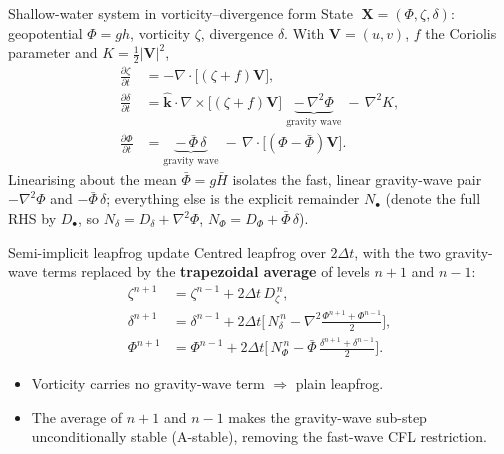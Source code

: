\documentclass{beamer}
\begin{document}
\begin{frame}{Shallow-water system in vorticity--divergence form}
    State $\;\mathbf{X}=(\Phi,\zeta,\delta)$: geopotential $\Phi=gh$, vorticity $\zeta$, divergence $\delta$.
    With $\mathbf{V}=(u,v)$, $f$ the Coriolis parameter and $K=\tfrac12|\mathbf V|^2$,
    \begin{align}
        \frac{\partial \zeta}{\partial t} &= -\nabla\!\cdot\!\big[(\zeta+f)\mathbf V\big], \\[2pt]
        \frac{\partial \delta}{\partial t} &= \hat{\mathbf k}\cdot\nabla\!\times\!\big[(\zeta+f)\mathbf V\big]
              \;\underbrace{-\,\nabla^2\Phi}_{\text{gravity wave}}\; -\,\nabla^2 K, \\[2pt]
        \frac{\partial \Phi}{\partial t} &= \underbrace{-\,\bar\Phi\,\delta}_{\text{gravity wave}}
              \;-\,\nabla\!\cdot\!\big[(\Phi-\bar\Phi)\mathbf V\big].
    \end{align}
    Linearising about the mean $\bar\Phi=g\bar H$ isolates the fast, linear gravity-wave pair
    $-\nabla^2\Phi$ and $-\bar\Phi\,\delta$; everything else is the explicit remainder
    $N_\bullet$ (denote the full RHS by $D_\bullet$, so $N_\delta=D_\delta+\nabla^2\Phi$, $N_\Phi=D_\Phi+\bar\Phi\,\delta$).
\end{frame}

\begin{frame}{Semi-implicit leapfrog update}
    Centred leapfrog over $2\Delta t$, with the two gravity-wave terms replaced by the
    \textbf{trapezoidal average} of levels $n{+}1$ and $n{-}1$:
    \begin{align}
        \zeta^{n+1} &= \zeta^{n-1} + 2\Delta t\, D_\zeta^{\,n}, \\
        \delta^{n+1} &= \delta^{n-1} + 2\Delta t\Big[\,N_\delta^{\,n}
                       - \nabla^2\tfrac{\Phi^{n+1}+\Phi^{n-1}}{2}\Big], \\
        \Phi^{n+1} &= \Phi^{n-1} + 2\Delta t\Big[\,N_\Phi^{\,n}
                     - \bar\Phi\,\tfrac{\delta^{n+1}+\delta^{n-1}}{2}\Big].
    \end{align}
    \begin{itemize}
        \item Vorticity carries no gravity-wave term $\Rightarrow$ plain leapfrog.
        \item The average of $n{+}1$ and $n{-}1$ makes the gravity-wave sub-step unconditionally
        stable (A-stable), removing the fast-wave CFL restriction.
    \end{itemize}
\end{frame}
\end{document}
